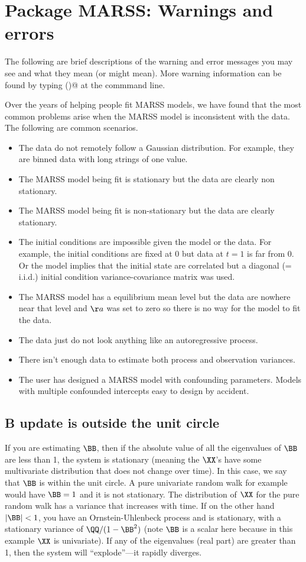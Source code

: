 \chapter{Package MARSS:  Warnings and errors}
\label{app:warnings}
The following are brief descriptions of the warning and error messages you may see and what they mean (or might mean).  More warning information can be found by typing \verb@MARSSinfo()@ at the commmand line.

Over the years of helping people fit MARSS models, we have found that the most common problems arise when the MARSS model is inconsistent with the data. The following are common scenarios.
\begin{itemize}
\item The data do not remotely follow a Gaussian distribution. For example, they are binned data with long strings of one value.
\item The MARSS model being fit is stationary but the data are clearly non stationary.
\item The MARSS model being fit is non-stationary but the data are clearly stationary.
\item The initial conditions are impossible given the model or the data. For example, the initial conditions are fixed at 0 but data at $t=1$ is far from 0. Or the model implies that the initial state are correlated but a diagonal (= i.i.d.) initial condition variance-covariance matrix was used.
\item The MARSS model has a equilibrium mean level but the data are nowhere near that level and $\aa$ was set to zero so there is no way for the model to fit the data.
\item The data just do not look anything like an autoregressive process.
\item There isn't enough data to estimate both process and observation variances.
\item The user has designed a MARSS model with confounding parameters. Models with multiple confounded intercepts easy to design by accident.
\end{itemize}

\section*{B update is outside the unit circle}
If you are estimating $\BB$, then if the absolute value of all the eigenvalues of $\BB$ are less than 1, the system is stationary (meaning the $\XX$'s have some multivariate distribution that does not change over time).  In this case, we say that $\BB$ is within the unit circle.  A pure univariate random walk for example would have $\BB=1$ and it is not stationary.  The distribution of $\XX$ for the pure random walk has a variance that increases with time.  If on the other hand $|\BB|<1$, you have an Ornstein-Uhlenbeck process and is stationary, with a stationary variance of $\QQ/(1-\BB^2)$ (note $\BB$ is a scalar here because in this example $\XX$ is univariate).  If any of the eigenvalues (real part) are greater than 1, then the system will ``explode''---it rapidly diverges.


